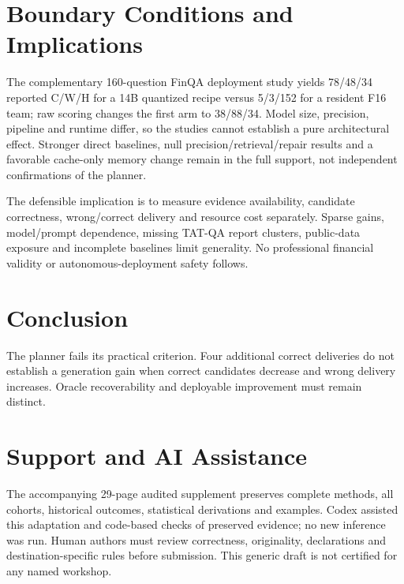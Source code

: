 \documentclass[10pt,twocolumn,letterpaper]{article}
\begin{document}
\section{Boundary Conditions and Implications}
The complementary 160-question FinQA deployment study yields 78/48/34 reported C/W/H for a 14B quantized recipe versus 5/3/152 for a resident F16 team; raw scoring changes the first arm to 38/88/34. Model size, precision, pipeline and runtime differ, so the studies cannot establish a pure architectural effect. Stronger direct baselines, null precision/retrieval/repair results and a favorable cache-only memory change remain in the full support, not independent confirmations of the planner.

The defensible implication is to measure evidence availability, candidate correctness, wrong/correct delivery and resource cost separately. Sparse gains, model/prompt dependence, missing TAT-QA report clusters, public-data exposure and incomplete baselines limit generality. No professional financial validity or autonomous-deployment safety follows.

\section{Conclusion}
The planner fails its practical criterion. Four additional correct deliveries do not establish a generation gain when correct candidates decrease and wrong delivery increases. Oracle recoverability and deployable improvement must remain distinct.
\section*{Support and AI Assistance}
The accompanying 29-page audited supplement preserves complete methods, all cohorts, historical outcomes, statistical derivations and examples. Codex assisted this adaptation and code-based checks of preserved evidence; no new inference was run. Human authors must review correctness, originality, declarations and destination-specific rules before submission. This generic draft is not certified for any named workshop.

\end{document}
